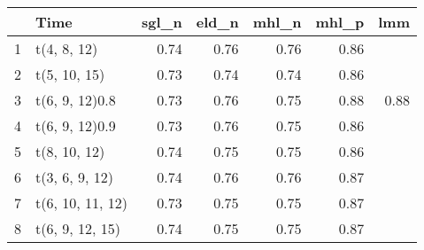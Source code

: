 \begin{table}[ht]
\centering
\begin{tabular}{rlrrrrr}
  \hline
 & Time & sgl\_n & eld\_n & mhl\_n & mhl\_p & lmm \\ 
  \hline
1 & t(4, 8, 12) & 0.74 & 0.76 & 0.76 & 0.86 &  \\ 
  2 & t(5, 10, 15) & 0.73 & 0.74 & 0.74 & 0.86 &  \\ 
  3 & t(6, 9, 12)0.8 & 0.73 & 0.76 & 0.75 & 0.88 & 0.88 \\ 
  4 & t(6, 9, 12)0.9 & 0.73 & 0.76 & 0.75 & 0.86 &  \\ 
  5 & t(8, 10, 12) & 0.74 & 0.75 & 0.75 & 0.86 &  \\ 
  6 & t(3, 6, 9, 12) & 0.74 & 0.76 & 0.76 & 0.87 &  \\ 
  7 & t(6, 10, 11, 12) & 0.73 & 0.75 & 0.75 & 0.87 &  \\ 
  8 & t(6, 9, 12, 15) & 0.74 & 0.75 & 0.75 & 0.87 &  \\ 
   \hline
\end{tabular}
\end{table}
